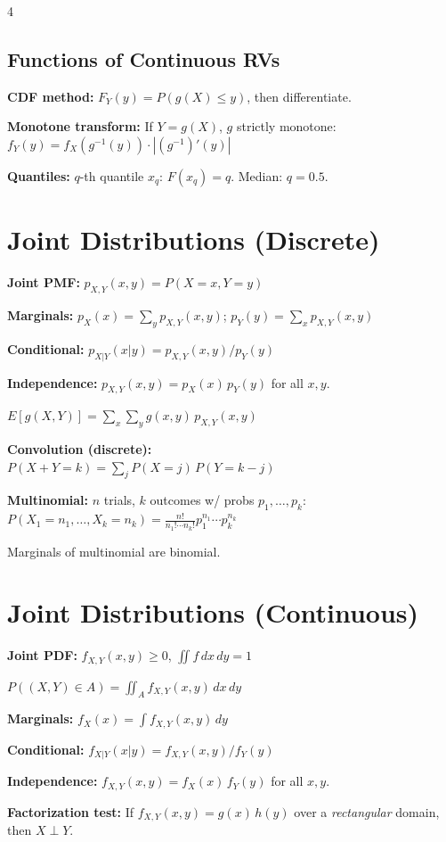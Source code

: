 \documentclass[6pt]{article}
\begin{document}
\begin{multicols}{4}
\subsection{Functions of Continuous RVs}
\textbf{CDF method:} $F_Y(y)=P(g(X)\leq y)$, then differentiate.

\textbf{Monotone transform:} If $Y=g(X)$, $g$ strictly monotone:\\
$f_Y(y)=f_X(g^{-1}(y))\cdot |{(g^{-1})'(y)}|$

\textbf{Quantiles:} $q$-th quantile $x_q$: $F(x_q)=q$. Median: $q=0.5$.

\section{Joint Distributions (Discrete)}

\textbf{Joint PMF:} $p_{X,Y}(x,y)=P(X{=}x,Y{=}y)$

\textbf{Marginals:} $p_X(x)=\sum_y p_{X,Y}(x,y)$;\; $p_Y(y)=\sum_x p_{X,Y}(x,y)$

\textbf{Conditional:} $p_{X|Y}(x|y)=p_{X,Y}(x,y)/p_Y(y)$

\textbf{Independence:} $p_{X,Y}(x,y)=p_X(x)\,p_Y(y)$ for all $x,y$.

$E[g(X,Y)]=\sum_x\sum_y g(x,y)\,p_{X,Y}(x,y)$

\textbf{Convolution (discrete):}\\
$P(X{+}Y{=}k)=\sum_j P(X{=}j)\,P(Y{=}k{-}j)$

\textbf{Multinomial:} $n$ trials, $k$ outcomes w/ probs $p_1,\ldots,p_k$:\\
$P(X_1{=}n_1,\ldots,X_k{=}n_k)=\frac{n!}{n_1!\cdots n_k!}p_1^{n_1}\cdots p_k^{n_k}$

Marginals of multinomial are binomial.

\section{Joint Distributions (Continuous)}

\textbf{Joint PDF:} $f_{X,Y}(x,y)\geq 0$, $\iint f\,dx\,dy=1$

$P((X,Y)\in A)=\iint_A f_{X,Y}(x,y)\,dx\,dy$

\textbf{Marginals:} $f_X(x)=\int f_{X,Y}(x,y)\,dy$

\textbf{Conditional:} $f_{X|Y}(x|y)=f_{X,Y}(x,y)/f_Y(y)$

\textbf{Independence:} $f_{X,Y}(x,y)=f_X(x)\,f_Y(y)$ for all $x,y$.

\textbf{Factorization test:} If $f_{X,Y}(x,y)=g(x)\,h(y)$ over a \emph{rectangular} domain, then $X\perp Y$.


\end{multicols}
\end{document}

